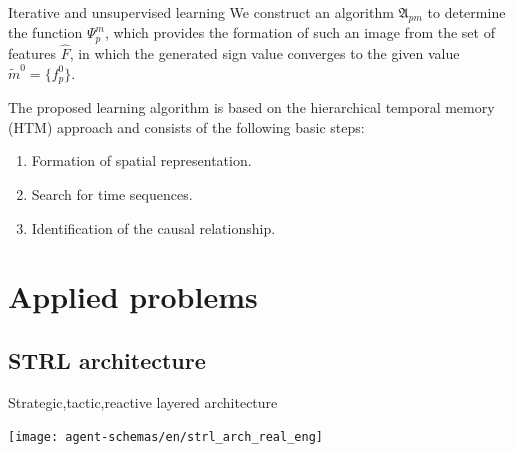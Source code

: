 \documentclass[default]{beamer}
\begin{document}
	\begin{frame}{Iterative and unsupervised learning}
		We construct an algorithm $\mathfrak A_{pm}$ to determine the function $\Psi_p^m$, which provides the formation of such an image from the set of features $\hat F$, in which the generated sign value converges to the given value $\tilde m^0=\{f_p^0\}$.
		\par\bigskip
		The proposed learning algorithm is based on the hierarchical temporal memory (HTM) approach and consists of the following basic steps:
		\begin{enumerate}
			\item Formation of spatial representation.
			\item Search for time sequences.
			\item Identification of the causal relationship.
		\end{enumerate}
		
		\nocite{*}
		\printbibliography[keyword={signform}, resetnumbers=true]
	\end{frame}

	\section{Applied problems}
	\subsection{STRL architecture}
	
	\begin{frame}{Strategic,tactic,reactive layered architecture}
		\begin{center}
			\texttt{[image: agent-schemas/en/strl\_arch\_real\_eng]}
		\end{center}
		\vspace{-5pt}
		\nocite{*}
		\printbibliography[keyword={strl}, resetnumbers=true]
	\end{frame}
\end{document}
